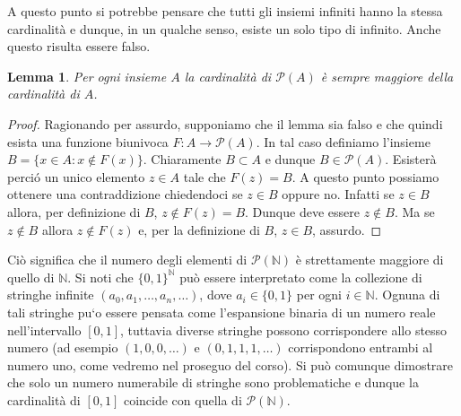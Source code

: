 \documentclass{amsart}
\newtheorem{lem}[thm]{Lemma}
\newcommand\Pa{{\mathcal P}}
\newcommand\N{{\mathbb N}}
\begin{document}
A questo punto si potrebbe pensare che tutti gli insiemi infiniti hanno
la stessa cardinalit\`a e dunque, in un qualche senso, esiste un solo
tipo di infinito. Anche questo risulta essere falso.
\begin{lem}\label{lem:poti}
Per ogni insieme $A$ la cardinalit\`a di $\Pa(A)$ \`e sempre maggiore
della cardinalit\`a di $A$.
\end{lem}
\begin{proof}
Ragionando per assurdo, supponiamo che il lemma sia falso e che quindi
esista una funzione 
biunivoca $F:A\to\Pa(A)$. In tal caso definiamo l'insieme $B=\{x\in A:
x\not\in F(x)\}$. Chiaramente $B\subset A$ e dunque
$B\in\Pa(A)$. Esister\`a perci\'o un unico elemento $z\in A$ tale che
$F(z)=B$. A questo punto possiamo ottenere una contraddizione
chiedendoci se $z\in B$ oppure no. Infatti se $z\in B$ allora, per
definizione di $B$, $z\not\in F(z)=B$. Dunque deve essere $z\not\in
B$. Ma se $z\not\in B$ allora $z\not\in F(z)$ e, per la definizione di
$B$, $z\in B$, assurdo.
\end{proof}
Ci\`o significa che il numero degli elementi di $\Pa(\N)$ \`e
strettamente maggiore di quello di $\N$. Si noti che $\{0,1\}^\N$
pu\`o essere interpretato come la collezione di stringhe infinite
$(a_0,a_1,\dots, a_n,\dots)$, dove $a_i\in\{0,1\}$ per ogni $i\in\N$. 
Ognuna di tali stringhe pu`o essere pensata come l'espansione binaria
di un numero reale nell'intervallo $[0,1]$, tuttavia diverse stringhe
possono corrispondere allo stesso numero (ad esempio $(1,0,0,\dots)$ e
$(0,1,1,1,\dots)$ corrispondono entrambi al numero uno, come vedremo
nel proseguo del corso). Si pu\`o comunque dimostrare che solo un
numero numerabile di stringhe sono problematiche e dunque la
cardinalit\`a di $[0,1]$  coincide con
quella di $\Pa(\N)$.
\end{document}
